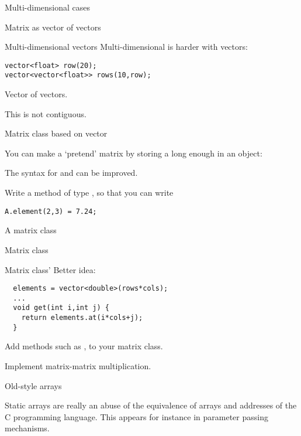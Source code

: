  {Multi-dimensional cases}

 {Matrix as vector of vectors}

\begin{block}{Multi-dimensional vectors}
  \label{sl:multi-vector}
  Multi-dimensional is harder with vectors:
\begin{verbatim}
vector<float> row(20);
vector<vector<float>> rows(10,row);
\end{verbatim}
Vector of vectors.
\end{block}

This is not contiguous.

 {Matrix class based on vector}

You can make a `pretend' matrix by storing a long enough  in
an object:
%

The syntax for  and  can be improved.
\begin{exercise}
  Write a method  of type , so that you can write
\begin{verbatim}
A.element(2,3) = 7.24;
\end{verbatim}
\end{exercise}

 {A matrix class}

\begin{block}{Matrix class}
  \label{sl:matrix-class}
\end{block}

\begin{block}{Matrix class'}
  \label{sl:matrix-class-cont}
  Better idea:
\begin{verbatim}
  elements = vector<double>(rows*cols);
  ...
  void get(int i,int j) {
    return elements.at(i*cols+j);
  }
\end{verbatim}
\end{block}


\begin{exercise}
  \label{ex:matrix-methods}
  Add methods such as ,  to your matrix class.

  Implement matrix-matrix multiplication.
\end{exercise}

 {Old-style arrays}

Static arrays are really an abuse of the equivalence of arrays and
addresses of the C programming language. This appears for instance in
parameter passing mechanisms.

